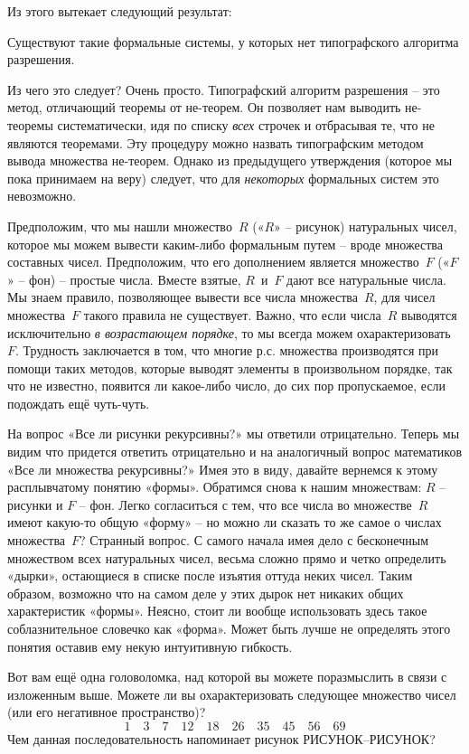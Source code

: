 \documentclass[../main.tex]{subfiles}
\begin{document}
Из этого вытекает следующий результат:
%
\begin{block}
    Существуют такие формальные системы, у которых нет типографского алгоритма разрешения.
\end{block}
%
Из чего это следует? Очень просто. Типографский алгоритм разрешения \--- это метод, отличающий теоремы от не-теорем. Он позволяет нам выводить не-теоремы систематически, идя по списку \emph{всех} строчек и отбрасывая те, что не являются теоремами. Эту процедуру можно назвать типографским методом вывода множества не-теорем. Однако из предыдущего утверждения (которое мы пока принимаем на веру) следует, что для \emph{некоторых} формальных систем это невозможно.

Предположим, что мы нашли множество~$R$ («$R$» \--- рисунок) натуральных чисел, которое мы можем вывести каким-либо формальным путем \--- вроде множества составных чисел. Предположим, что его дополнением является множество~$F$ («$F$» \--- фон) \--- простые числа. Вместе взятые, $R$~и~$F$ дают все натуральные числа. Мы знаем правило, позволяющее вывести все числа множества~$R$, для чисел множества~$F$ такого правила не существует. Важно, что если числа~$R$ выводятся исключительно \emph{в возрастающем порядке}, то мы всегда можем охарактеризовать~$F$. Трудность заключается в том, что многие р.с. множества производятся при помощи таких методов, которые выводят элементы в произвольном порядке, так что не известно, появится ли какое-либо число, до сих пор пропускаемое, если подождать ещё чуть-чуть.

На вопрос «Все ли рисунки рекурсивны?» мы ответили отрицательно. Теперь мы видим что придется ответить отрицательно и на аналогичный вопрос математиков «Все ли множества рекурсивны?» Имея это в виду, давайте вернемся к этому расплывчатому понятию «формы». Обратимся снова к нашим множествам: $R$ \--- рисунки и $F$ \--- фон. Легко согласиться с тем, что все числа во множестве~$R$ имеют какую-то общую «форму» \--- но можно ли сказать то же самое о числах множества~$F$? Странный вопрос. С самого начала имея дело с бесконечным множеством всех натуральных чисел, весьма сложно прямо и четко определить «дырки», остающиеся в списке после изъятия оттуда неких чисел. Таким образом, возможно что на самом деле у этих дырок нет никаких общих характеристик «формы». Неясно, стоит ли вообще использовать здесь такое соблазнительное словечко как «форма». Может быть лучше не определять этого понятия оставив ему некую интуитивную гибкость.

Вот вам ещё одна головоломка, над которой вы можете поразмыслить в связи с изложенным выше. Можете ли вы охарактеризовать следующее множество чисел (или его негативное пространство)?
\[
    1 \quad 3 \quad 7 \quad 12 \quad 18 \quad 26 \quad 35 \quad 45 \quad 56 \quad 69
\]
Чем данная последовательность напоминает рисунок РИСУНОК--РИСУНОК?
\end{document}
